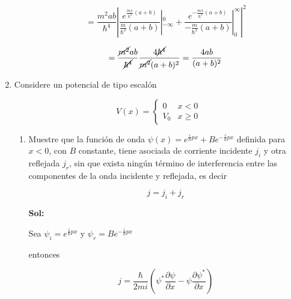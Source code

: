 \documentclass[12pt,a4paper]{article}
\begin{document}
\begin{enumerate}
\begin{enumerate}
        \begin{equation*}
            = \frac{m^2 ab}{\hbar^4}  \left| \frac{e^{\frac{mx}{\hbar^2} (a+b)}}{\frac{m}{\hbar^2} (a+b)} |_{-\infty}^{0}  +  \frac{e^{-\frac{mx}{\hbar^2}(a+b)}}{-\frac{m}{\hbar^2}(a+b)} |_{0}^{\infty}\right|^2
        \end{equation*}
        
        \begin{equation*}
            = \frac{\cancel{m^2} ab}{\cancel{\hbar^4}}  \frac{4\cancel{\hbar^4}}{\cancel{m^2} (a+b)^2 } = \frac{4ab}{(a+b)^2}
        \end{equation*}
        
    \end{enumerate}
    
    
    
    
    
    
    \item Considere un potencial de tipo escalón 
    
    \begin{equation*}
        V(x) = \left\{\begin{array}{lcc}
             0  & x < 0 \\
              V_0 & x \geq 0
             \end{array} \right.
    \end{equation*}
    
    \begin{enumerate}
        \item Muestre que la función de onda $\psi(x) = e^{\frac{i}{\hbar} px} + B e^{-\frac{i}{\hbar}px}$ definida para $x<0$, con $B$ constante, tiene  asociada de corriente incidente $j_i$ y otra reflejada $j_r$, sin que exista ningún término de interferencia entre las componentes de la onda incidente y reflejada, es decir
        
        \begin{equation*}
            j = j_i + j_r
        \end{equation*}
        
        \textbf{Sol:}
        
        Sea $\psi_{i} = e^{\frac{i}{\hbar}px}$ y $\psi_{r} = B e^{-\frac{i}{\hbar}px}$
        
        entonces 
        
        \begin{equation*}
            j = \frac{\hbar}{2 m i} \left(\psi^* \frac{\partial \psi}{\partial x} - \psi \frac{\partial \psi^*}{\partial x}\right)
        \end{equation*}
        

\end{enumerate}
\end{enumerate}
\end{document}
